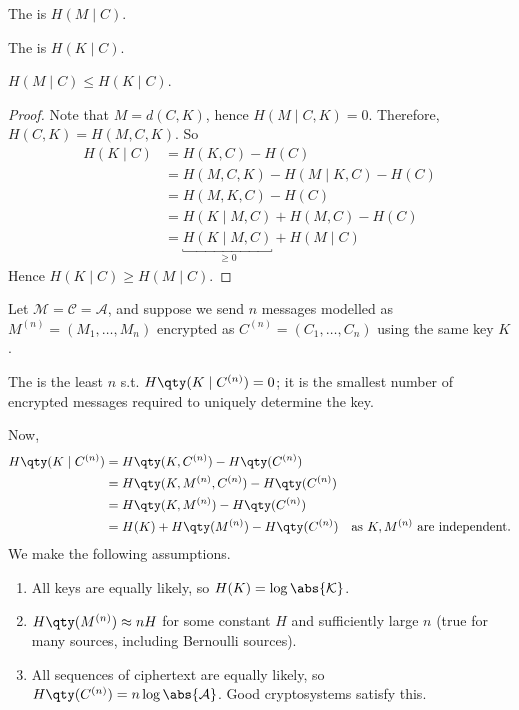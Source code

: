 \begin{definition}
    The  is $H(M \mid C)$.
\end{definition}

\begin{definition}
    The  is $H(K \mid C)$.
\end{definition}

\begin{lemma}
    $H(M \mid C) \leq H(K \mid C)$.
\end{lemma}

\begin{proof}
    Note that $M = d(C,K)$, hence $H(M \mid C, K) = 0$.
    Therefore, $H(C,K) = H(M,C,K)$.
    So
    \begin{align*}
        H(K \mid C) &= H(K,C) - H(C) \\
        &= H(M,C,K) - H(M \mid K,C) - H(C) \\
        &= H(M,K,C) - H(C) \\
        &= H(K \mid M,C) + H(M,C) - H(C) \\
        &= \underbracket{H(K \mid M, C)}_{\geq 0} + H(M \mid C)
    \end{align*}
    Hence $H(K \mid C) \geq H(M \mid C)$.
\end{proof}

Let $\mathcal M = \mathcal C = \mathcal A$, and suppose we send $n$ messages modelled as $M^{(n)} = (M_1, \dots, M_n)$ encrypted as $C^{(n)} = (C_1, \dots, C_n)$ using the same key $K$.

\begin{definition}
    The  is the least $n$ s.t. $H\qty(K \mid C^{(n)}) = 0$; it is the smallest number of encrypted messages required to uniquely determine the key.
\end{definition}

Now,
\begin{align*}
    H\qty(K \mid C^{(n)}) &= H\qty(K, C^{(n)}) - H\qty(C^{(n)}) \\
    &= H\qty(K, M^{(n)}, C^{(n)}) - H\qty(C^{(n)}) \\
    &= H\qty(K, M^{(n)}) - H\qty(C^{(n)}) \\
    &= H(K) + H\qty(M^{(n)}) - H\qty(C^{(n)}) \quad \text{as $K, M^{(n)}$ are independent.}
\end{align*}
We make the following assumptions.
\begin{enumerate}
    \item All keys are equally likely, so $H(K) = \log \abs{\mathcal K}$.
    \item $H\qty(M^{(n)}) \approx nH$ for some constant $H$ and sufficiently large $n$ (true for many sources, including Bernoulli sources).
    \item All sequences of ciphertext are equally likely, so $H\qty(C^{(n)}) = n \log \abs{\mathcal A}$. Good cryptosystems satisfy this.
\end{enumerate}

